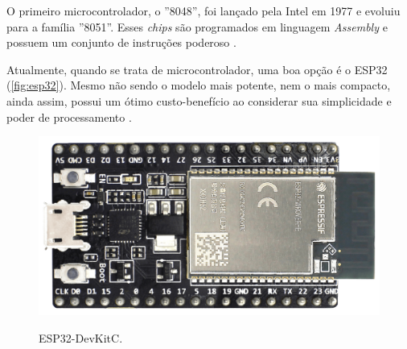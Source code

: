 O primeiro microcontrolador, o ''8048'', foi lançado pela Intel em 1977 e evoluiu 
para a família ''8051''. Esses \textit{chips} são programados em linguagem \textit{Assembly} e 
possuem um conjunto de instruções poderoso \cite[p.16]{penido2013}.

Atualmente, quando se trata de microcontrolador, uma boa opção é o ESP32 (\autoref{fig:esp32}). Mesmo não 
sendo o modelo mais potente, nem o mais compacto, ainda assim, possui um ótimo 
custo-benefício ao considerar sua simplicidade e poder de processamento \cite{espressif2022c}.

\begin{figure}[h!]
    \centering
    \caption{ESP32-DevKitC.}
    \includegraphics[scale=0.1]{figuras/esp323.png} 
    \label{fig:esp32}
    \centering
\end{figure}